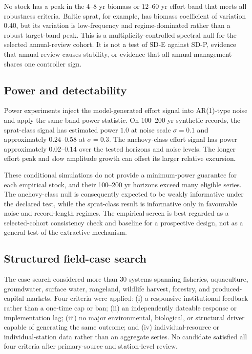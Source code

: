 \documentclass[11pt]{article}
\begin{document}
No stock has a peak in the $4$--$8$ yr biomass or $12$--$60$ yr effort band that meets all robustness criteria. Baltic sprat, for example, has biomass coefficient of variation $0.40$, but its variation is low-frequency and regime-dominated rather than a robust target-band peak. This is a multiplicity-controlled spectral null for the selected annual-review cohort. It is not a test of SD-E against SD-P, evidence that annual review causes stability, or evidence that all annual management shares one controller sign.

\subsection{Power and detectability}

Power experiments inject the model-generated effort signal into AR(1)-type noise and apply the same band-power statistic. On 100--200 yr synthetic records, the sprat-class signal has estimated power $1.0$ at noise scale $\sigma=0.1$ and approximately $0.24$--$0.58$ at $\sigma=0.3$. The anchovy-class effort signal has power approximately $0.02$--$0.14$ over the tested horizons and noise levels. The longer effort peak and slow amplitude growth can offset its larger relative excursion.

These conditional simulations do not provide a minimum-power guarantee for each empirical stock, and their 100--200 yr horizons exceed many eligible series. The anchovy-class null is consequently expected to be weakly informative under the declared test, while the sprat-class result is informative only in favourable noise and record-length regimes. The empirical screen is best regarded as a selected-cohort consistency check and baseline for a prospective design, not as a general test of the extractive mechanism.

\subsection{Structured field-case search}

The case search considered more than 30 systems spanning fisheries, aquaculture, groundwater, surface water, rangeland, wildlife harvest, forestry, and produced-capital markets. Four criteria were applied: (i) a responsive institutional feedback rather than a one-time cap or ban; (ii) an independently dateable response or implementation lag; (iii) no major environmental, biological, or structural driver capable of generating the same outcome; and (iv) individual-resource or individual-station data rather than an aggregate series. No candidate satisfied all four criteria after primary-source and station-level review.
\end{document}
